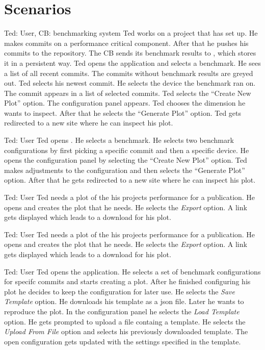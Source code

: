 \section{Scenarios}

{Ted: User, CB: \Gls{benchmarking system}}
{Ted works on a project that has \parkview{} set up. He makes commits on a performance critical component. After that he pushes his commits to the repository. The CB sends its \glspl{benchmark result} to \parkview{}, which stores it in a persistent way. Ted opens the application and selects a \gls{benchmark}. He sees a list of all recent commits. The commits without \glspl{benchmark result} are greyed out. Ted selects his newest commit. He selects the device the \gls{benchmark} ran on. The commit appears in a list of selected commits. Ted selects the \enquote{Create New Plot} option. The configuration panel appears. Ted chooses the dimension he wants to inspect. After that he selects the \enquote{Generate Plot} option. Ted gets redirected to a new site where he can inspect his \gls{plot}.}

{Ted: User}
{Ted opens \parkview{}. He selects a \gls{benchmark}. He selects two \glspl{benchmark configuration} by first picking a specific commit and then a specific device. He opens the configuration panel by selecting the \enquote{Create New Plot} option. Ted makes adjustments to the \gls{configuration} and then selects the \enquote{Generate Plot} option. After that he gets redirected to a new site where he can inspect his \gls{plot}.}

{Ted: User}
{Ted needs a \gls{plot} of the his projects performance for a publication. He opens \parkview{} and creates the \gls{plot} that he needs. He selects the \emph{Export} option. A link gets displayed which leads to a download for his \gls{plot}.}

{Ted: User}
{Ted needs a \gls{plot} of the his projects performance for a publication. He opens \parkview{} and creates the \gls{plot} that he needs. He selects the \emph{Export} option. A link gets displayed which leads to a download for his \gls{plot}.}

{Ted: User}
{Ted opens the application. He selects a set of \glspl{benchmark configuration} for specifc commits and starts creating a \gls{plot}. After he finished configuring his \gls{plot} he decides to keep the \gls{configuration} for later use. He selects the \emph{Save Template} option. He downloads his template as a \gls{json} file. Later he wants to reproduce the \gls{plot}. In the configuration panel he selects the \emph{Load Template} option. He gets prompted to upload a file containg a \gls{template}. He selects the \emph{Upload From File} option and selects his previously downloaded \gls{template}. The open \gls{configuration} gets updated with the settings specified in the \gls{template}.}

